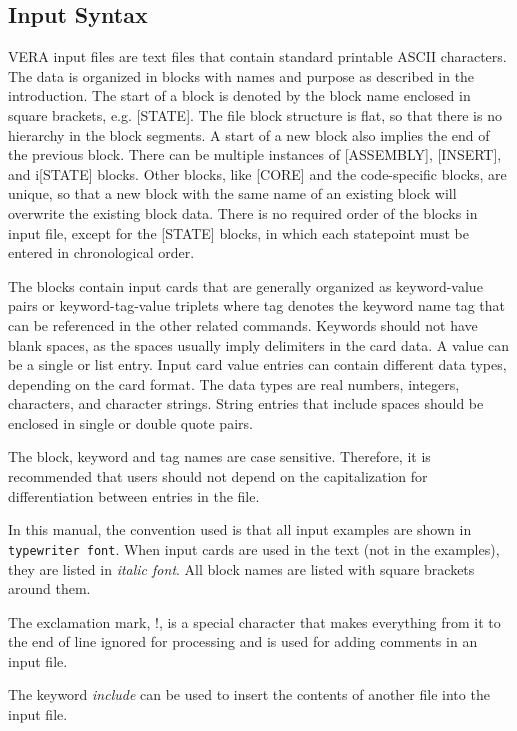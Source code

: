 \documentclass[11pt]{caslreport}
\begin{document}
\subsection{Input Syntax}
\label{sec:inputsyntax}

VERA input files are text files that contain standard printable ASCII characters.
The data is organized in blocks with names and purpose as described in the
introduction. The start of a block is denoted by the block name enclosed in
square brackets, e.g. [STATE]. The file block structure is flat, so that there is
no hierarchy in the block segments. A start of a new block also implies the end of
the previous block. There can be multiple instances of [ASSEMBLY], [INSERT], and i[STATE] blocks.
Other blocks, like [CORE] and the code-specific blocks, are unique, so that a new
block with the same name of an existing block will overwrite the existing block data.
There is no required order of the blocks in input file, except for the [STATE] blocks,
in which each statepoint must be entered in chronological order.

The blocks contain input cards that are generally organized as keyword-value pairs
or keyword-tag-value triplets where tag denotes the keyword name tag that can be
referenced in the other related commands. Keywords should not have blank spaces,
as the spaces usually imply delimiters in the card data.  A value can be a single
or list entry.
Input card value entries can contain different data types, depending on the card format.
The data types are real numbers, integers, characters, and character strings.
String entries that include spaces should be enclosed in
single or double quote pairs.

The block, keyword and tag names are case sensitive.  Therefore, it is recommended
that users should not depend on the capitalization for differentiation between
entries in the file.

In this manual, the convention used is that all input examples are shown in {\tt typewriter font}.
When input cards are used in the text (not in the examples), they are listed in {\it italic font}.
All block names are listed with square brackets around them.

The exclamation mark, !,  is a special character that makes everything from it to the
end of line ignored for processing and is used for adding comments in an input file.

The keyword {\it include} can be used to insert the contents of another file into the input file.
\end{document}
